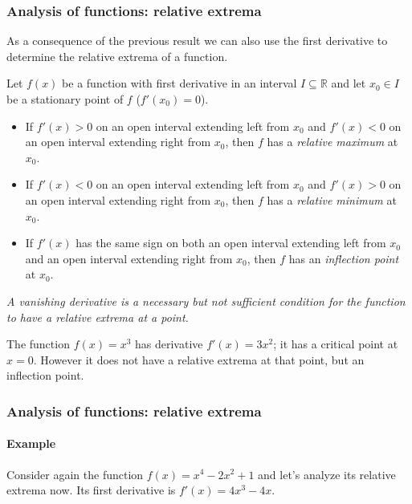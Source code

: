 \begin{frame}
\frametitle{Analysis of functions: relative extrema}
As a consequence of the previous result we can also use the first derivative to determine the relative extrema of a function. 
\begin{theorem}
Let $f(x)$ be a function with first derivative in an interval $I\subseteq \mathbb{R}$ and let $x_0\in I$ be a stationary point of $f$ ($f'(x_0)=0$).
\begin{itemize}
\item  If $f'(x)>0$ on an open interval extending left from $x_0$ and $f'(x)<0$ on an open interval extending right from $x_0$, then $f$ has a \emph{relative maximum} at $x_0$.
\item  If $f'(x)<0$ on an open interval extending left from $x_0$ and $f'(x)>0$ on an open interval extending right from $x_0$, then $f$ has a \emph{relative minimum} at $x_0$.
\item If $f'(x)$ has the same sign on both an open interval extending left from $x_0$ and an open interval extending right from $x_0$, then $f$ has an \emph{inflection point} at $x_0$.
\end{itemize}
\end{theorem}

 \emph{A vanishing derivative is a necessary but not sufficient condition for the function to have a relative extrema at a point.}

 The function $f(x)=x^3$ has derivative $f'(x)=3x^2$; it has a critical point at $x=0$.
However it does not have a relative extrema at that point, but an inflection point.
\end{frame}


\begin{frame}
\frametitle{Analysis of functions: relative extrema}
\framesubtitle{Example}
Consider again the function $f(x)=x^4-2x^2+1$ and let's analyze its relative extrema now. 
Its first derivative is $f'(x)=4x^3-4x$.
\begin{center}
\scalebox{0.9}{}
\end{center}
\end{frame}



